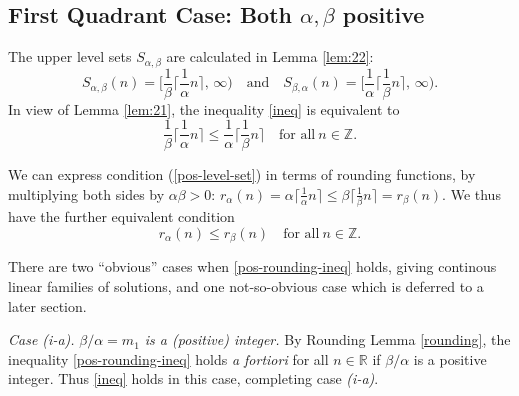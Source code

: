 \documentclass[12pt,letterpaper, reqno]{amsart}
\theoremstyle{definition}
\theoremstyle{remark}
\newcommand{\RR}{\ensuremath{\mathbb{R}}}
\newcommand{\ZZ}{\ensuremath{\mathbb{Z}}}
\newcommand{\floor}[1]{\lfloor{#1}\rfloor}
\newcommand{\ceil}[1]{\lceil{#1}\rceil}
\begin{document}
\subsection{First Quadrant Case: Both $\alpha,\beta$ positive}\label{sec:32}
The upper level sets $S_{\alpha,\beta}$ are calculated in Lemma \ref{lem:22}:
\[ 
S_{\alpha,\beta}(n)  = \bigg[ \frac1\beta \ceil{\frac{1}{\alpha}n}, \,\infty \bigg)
\quad\text{and}\quad
 S_{\beta,\alpha}(n) = \bigg[ \frac1\alpha \ceil{\frac{1}{\beta} n}, \, \infty \bigg).
 \]
 In view of Lemma \ref{lem:21}, the inequality \eqref{ineq} is equivalent to
\begin{equation}\label{pos-level-set}
\frac1\beta \ceil{ \frac{1}{\alpha}n} \leq \frac1\alpha \ceil{\frac{1}{\beta}n} \quad\text{for all}\ n\in\ZZ.
\end{equation}

We can  express
 condition (\ref{pos-level-set}) in terms of rounding functions,
 by  multiplying both sides by $\alpha\beta>0$:
 $r_\alpha(n) =\alpha \ceil{\frac{1}{\alpha} n} \leq \beta \ceil{\frac{1}{\beta} n}= r_\beta(n)$.
We thus have the further equivalent condition
\begin{equation}\label{pos-rounding-ineq}
r_{\alpha}(n) \leq r_{\beta}(n)  \quad\text{for all}\ n\in\ZZ.
\end{equation}

There are two ``obvious'' cases when \eqref{pos-rounding-ineq} holds, giving continous linear families of solutions, and one not-so-obvious case which is deferred to a later section.

{\em Case {\it (i-a)}.} {\em ${\beta}/{\alpha}=m_1$ is a (positive)  integer.}
By Rounding Lemma \ref{rounding}, the inequality \eqref{pos-rounding-ineq}
 holds {\em a fortiori}  for all $n\in\RR$ if $\beta/\alpha$ is a positive integer. Thus \eqref{ineq} holds in this case, completing case {\it (i-a)}.
\smallskip
 
\end{document}
